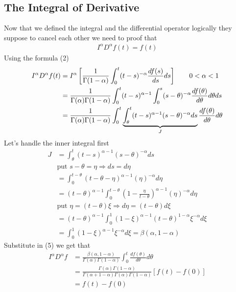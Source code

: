 \subsection{The Integral of Derivative}
Now that we defined the integral and the differential operator logically they suppose to cancel each other
we need to proof that
\begin{align*}
    I^{\alpha}D^{\alpha}f(t) = f(t)
\end{align*}
Using the formula (2)
\begin{align}
    \notag
    I^{\alpha}D^{\alpha}f(t) & = I^{\alpha}\left[\frac{1}{\Gamma(1-\alpha)}\int_{0}^{t}(t-s)^{-\alpha}\frac{d f(s)}{ds}ds\right] \qquad 0 < \alpha < 1
    \\\notag
                             & = \frac{1}{\Gamma(\alpha)\Gamma(1-\alpha)} \int_{0}^{t}(t-s)^{\alpha-1} \int_{0}^{s}(s-\theta)^{-\alpha} \frac{d f(\theta)}{d\theta} d\theta ds
    \\
                             & = \frac{1}{\Gamma(\alpha)\Gamma(1-\alpha)} \int_{0}^{t}\underbrace{\int_{\theta}^{t}(t-s)^{\alpha-1}(s-\theta)^{-\alpha} ds}_J  \frac{d f(\theta)}{d\theta} d\theta
\end{align}
Let's handle the inner integral first
\begin{align*}
    J & = \int_{\theta}^{t}(t-s)^{\alpha-1}(s-\theta)^{-\alpha} ds
    \\
      & \text{put } s-\theta = \eta \Longrightarrow ds = d\eta
    \\
      & = \int_{0}^{t-\theta}(t-\theta-\eta)^{\alpha-1}(\eta)^{-\alpha} d\eta
    \\
      & = (t-\theta)^{\alpha-1} \int_{0}^{t-\theta}(1-\frac{\eta}{t-\theta})^{\alpha-1}(\eta)^{-\alpha} d\eta
    \\
      & \text{put } \eta = (t-\theta)\xi  \Longrightarrow d\eta = (t-\theta)d\xi
    \\
      & = (t-\theta)^{\alpha-1} \int_{0}^{1}(1-\xi)^{\alpha-1} (t-\theta)^{1-\alpha} \xi^{-\alpha} d\xi
    \\
      & = \int_{0}^{1}(1-\xi)^{\alpha-1} \xi^{-\alpha} d\xi = \beta(\alpha,1-\alpha)
\end{align*}
Substitute in (5) we get that
\begin{align*}
    I^{\alpha}D^{\alpha}f & = \frac{\beta(\alpha,1-\alpha)}{\Gamma(\alpha)\Gamma(1-\alpha)}\int_{0}^{t}\frac{d f(\theta)}{d\theta} d\theta
    \\
                          & = \frac{\Gamma(\alpha)\Gamma(1-\alpha)}{\Gamma(\alpha+1-\alpha)\Gamma(\alpha)\Gamma(1-\alpha)}[f(t)-f(0)]
    \\
                          & = f(t)-f(0)
\end{align*}
\setcounter{equation}{0}
\newpage
